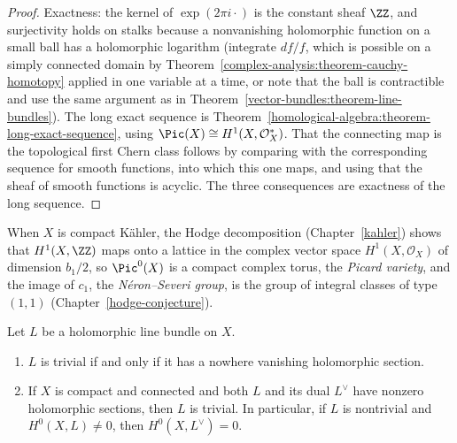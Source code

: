 \begin{proof}
Exactness: the kernel of $\exp(2\pi i \cdot)$ is the constant sheaf $\ZZ$, and surjectivity holds on stalks because a nonvanishing holomorphic function on a small ball has a holomorphic logarithm (integrate
$df/f$, which is possible on a simply connected domain by Theorem~\ref{complex-analysis:theorem-cauchy-homotopy} applied in one variable at a time, or note that the ball is contractible and use the same
argument as in Theorem~\ref{vector-bundles:theorem-line-bundles}). The long exact sequence is Theorem~\ref{homological-algebra:theorem-long-exact-sequence}, using
$\Pic(X) \cong H^1(X, \mathcal{O}_X^*)$. That the connecting map is the topological first Chern class follows by comparing with the corresponding sequence for smooth functions, into which this one maps, and
using that the sheaf of smooth functions is acyclic. The three consequences are exactness of the long sequence.
\end{proof}

\begin{remark}\label{complex-manifolds:remark-picard-variety}
When $X$ is compact K\"ahler, the Hodge decomposition (Chapter~\ref{kahler}) shows that $H^1(X, \ZZ)$ maps onto a lattice in the complex vector space $H^1(X, \mathcal{O}_X)$ of dimension
$b_1/2$, so $\Pic^0(X)$ is a compact complex torus, the \emph{Picard variety}, and the image of $c_1$, the \emph{N\'eron--Severi group}, is the group of integral classes of type $(1,1)$
(Chapter~\ref{hodge-conjecture}).
\end{remark}

\begin{lemma}\label{complex-manifolds:lemma-trivial-sections}
Let $L$ be a holomorphic line bundle on $X$.
\begin{enumerate}
\item $L$ is trivial if and only if it has a nowhere vanishing holomorphic section.
\item If $X$ is compact and connected and both $L$ and its dual $L^\vee$ have nonzero holomorphic sections, then $L$ is trivial. In particular, if $L$ is nontrivial and $H^0(X, L) \neq 0$, then
$H^0(X, L^\vee) = 0$.
\end{enumerate}
\end{lemma}

